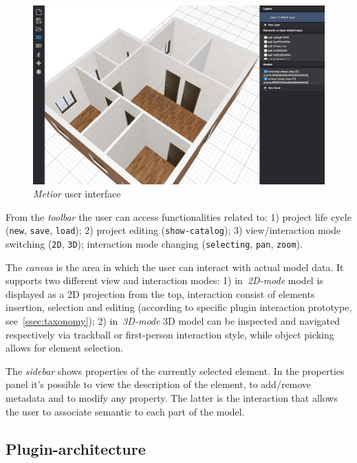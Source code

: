 \begin{figure}[htbp] %
   \centering

   \includegraphics[width=1\linewidth]{images/3d}

   \caption{\emph{Metior} user interface}
   \label{fig:ui}
\end{figure}

\noindent From the \emph{toolbar} the user can access functionalities related to: 1) project life cycle ({\tt new}, {\tt save}, {\tt load}); 2) project editing  ({\tt  show-catalog}); 3) view/interaction mode switching ({\tt 2D}, {\tt  3D}); interaction mode changing ({\tt  selecting}, {\tt pan}, {\tt zoom}).


\noindent The \emph{canvas} is the area in which the user can interact with actual model data. It supports two different view and interaction modes: 1) in~\emph{2D-mode} model is displayed as a 2D projection from the top, interaction consist of elements insertion, selection and editing (according to specific plugin interaction prototype, see~\ref{ssec:taxonomy}); 2) in~\emph{3D-mode} 3D model can be inspected and navigated respectively via trackball or first-person interaction style, while object picking allows for element selection.

\noindent The \emph{sidebar} shows properties of the currently selected element.
In the properties panel it's possible to view the description of the element, to add/remove metadata and to modify any property. The latter is the interaction that allows the user to associate semantic to each part of the model.

\subsection{Plugin-architecture}


